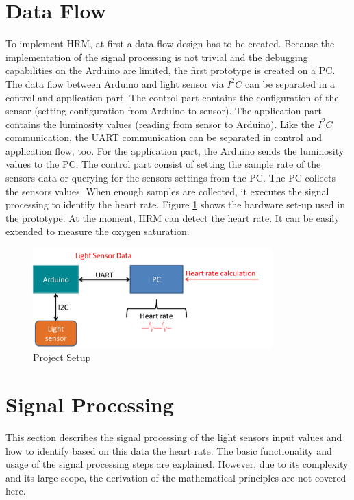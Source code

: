 \documentclass[notitlepage]{scrreprt}
\begin{document}
\section{Data Flow}
To implement HRM, at first a data flow design has to be created. Because the implementation of the signal processing is not trivial and the debugging capabilities on the Arduino are limited, the first prototype is created on a PC. The data flow between Arduino and light sensor via $I^2C$ can be separated in a control and application part. The control part contains the configuration of the sensor (setting configuration from Arduino to sensor). The application part contains the luminosity values (reading from sensor to Arduino). Like the $I^2C$ communication, the UART communication can be separated in control and application flow, too. For the application part, the Arduino sends the luminosity values to the PC. The control part consist of setting the sample rate of the sensors data or querying for the sensors settings from the PC. The PC collects the sensors values. When enough samples are collected, it executes the signal processing to identify the heart rate. Figure \ref{fig:data-flow2} shows the hardware set-up used in the prototype. At the moment, HRM can detect the heart rate. It can be easily extended to measure the oxygen saturation.

\begin{figure}[H]
	\centering
	\includegraphics[width=350px]{images/general_dataFlow_second.png}
	\caption{Project Setup}
	\label{fig:data-flow2}
\end{figure}

\section{Signal Processing}
\label{sec:signal-processing}
This section describes the signal processing of the light sensors input values and how to identify based on this data the heart rate. The basic functionality and usage of the signal processing steps are explained. However, due to its complexity and its large scope, the derivation of the mathematical principles are not covered here.
\end{document}
